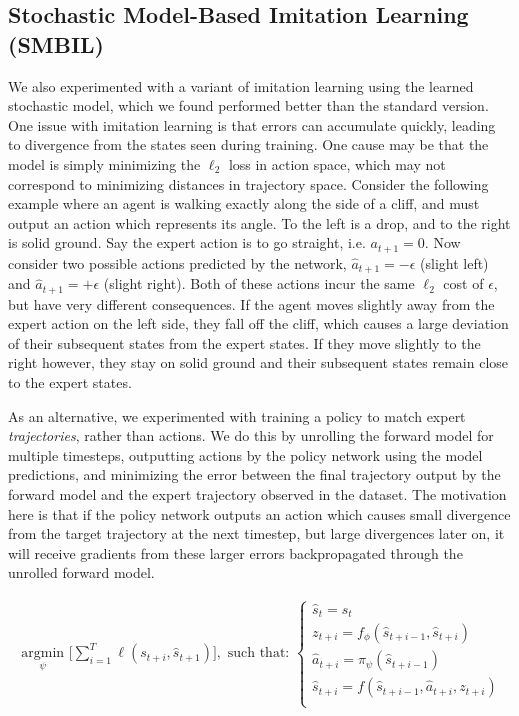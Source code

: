 \documentclass{article} %
\begin{document}
  \subsection{Stochastic Model-Based Imitation Learning (SMBIL)}

  We also experimented with a variant of imitation learning using the learned stochastic model, which we found performed better than the standard version. One issue with imitation learning is that errors can accumulate quickly, leading to divergence from the states seen during training.
  One cause may be that the model is simply minimizing the $\ell_2$ loss in action space, which may not correspond to minimizing distances in trajectory space.
  Consider the following example where an agent is walking exactly along the side of a cliff, and must output an action which represents its angle.
  To the left is a drop, and to the right is solid ground.
  Say the expert action is to go straight, i.e. $a_{t+1} = 0$. Now consider two possible actions predicted by the network, $\hat{a}_{t+1} = -\epsilon$ (slight left) and $\hat{a}_{t+1} = +\epsilon$ (slight right).
  Both of these actions incur the same $\ell_2$ cost of $\epsilon$, but have very different consequences. If the agent moves slightly away from the expert action on the left side, they fall off the cliff, which causes a large deviation of their subsequent states from the expert states. If they move slightly to the right however, they stay on solid ground and their subsequent states remain close to the expert states.

  As an alternative, we experimented with training a policy to match expert \textit{trajectories}, rather than actions.
  We do this by unrolling the forward model for multiple timesteps, outputting actions by the policy network using the model predictions, and minimizing the error between the final trajectory output by the forward model and the expert trajectory observed in the dataset.
  The motivation here is that if the policy network outputs an action which causes small divergence from the target trajectory at the next timestep, but large divergences later on, it will receive gradients from these larger errors backpropagated through the unrolled forward model.

    \begin{align*}
    \underset{\psi}{\mbox{ argmin }} \Big[ \sum_{i=1}^{T} \ell(s_{t+i}, \hat{s}_{t+1}) \Big],  \mbox{ such that: }
    \begin{cases}
      \hat{s}_t = s_t \\
      z_{t+i} = f_\phi(\hat{s}_{t+i-1}, \hat{s}_{t+i}) \\
      \hat{a}_{t+i} = \pi_\psi(\hat{s}_{t+i-1}) \\
      \hat{s}_{t+i} = f(\hat{s}_{t+i-1}, \hat{a}_{t+i}, z_{t+i}) \\
      \end{cases}
  \end{align*}
\end{document}
